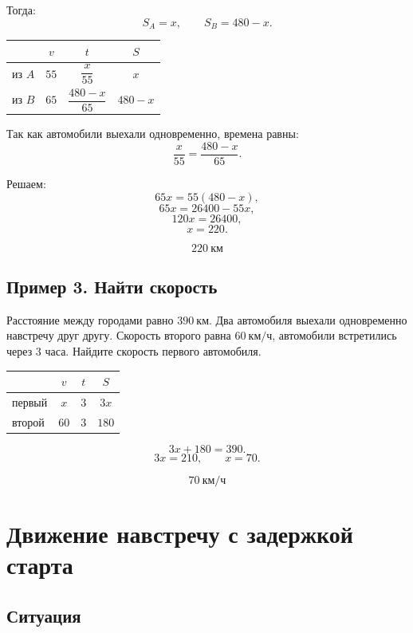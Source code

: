 \documentclass[a4paper,12pt]{article}
\newcommand{\kmh}{\text{км/ч}}
\newcommand{\km}{\text{км}}
\begin{document}
Тогда:
\[
S_A=x, \qquad S_B=480-x.
\]

\begin{center}
\renewcommand{\arraystretch}{1.35}
\begin{tabularx}{0.8\linewidth}{X c c c}
\toprule
 & $v$ & $t$ & $S$ \\
\midrule
из $A$ & $55$ & $\dfrac{x}{55}$ & $x$ \\
из $B$ & $65$ & $\dfrac{480-x}{65}$ & $480-x$ \\
\bottomrule
\end{tabularx}
\end{center}

Так как автомобили выехали одновременно, времена равны:
\[
\frac{x}{55}=\frac{480-x}{65}.
\]

Решаем:
\[
65x=55(480-x),
\]
\[
65x=26400-55x,
\]
\[
120x=26400,
\]
\[
x=220.
\]

\[
\boxed{220\ \km}
\]

\subsection{Пример 3. Найти скорость}

Расстояние между городами равно $390\ \km$. Два автомобиля выехали одновременно навстречу друг другу. Скорость второго равна $60\ \kmh$, автомобили встретились через $3$ часа. Найдите скорость первого автомобиля.

\begin{center}
\renewcommand{\arraystretch}{1.35}
\begin{tabularx}{0.7\linewidth}{X c c c}
\toprule
 & $v$ & $t$ & $S$ \\
\midrule
первый & $x$ & $3$ & $3x$ \\
второй & $60$ & $3$ & $180$ \\
\bottomrule
\end{tabularx}
\end{center}

\[
3x+180=390.
\]
\[
3x=210, \qquad x=70.
\]

\[
\boxed{70\ \kmh}
\]

\section{Движение навстречу с задержкой старта}

\subsection{Ситуация}
\end{document}

